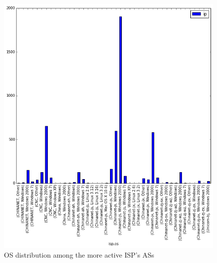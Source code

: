 \begin{figure}[h]
     \caption{OS distribution among the more active ISP's ASs}
     \label{fig:os_distribution}
    \centering
    \includegraphics[width=\linewidth]{images/os_isp}
\end{figure}
